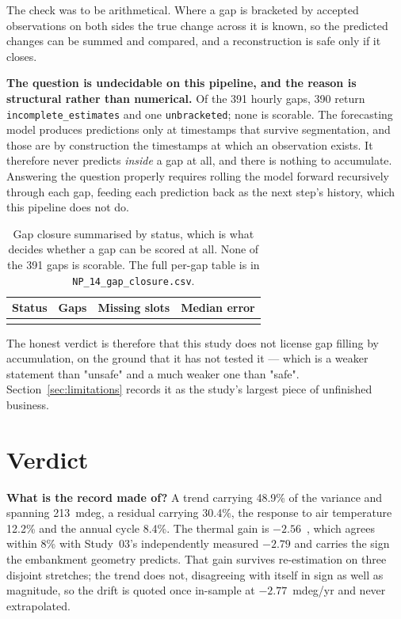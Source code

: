 \documentclass[11pt,a4paper]{article}
\begin{document}
The check was to be arithmetical. Where a gap is bracketed by accepted
observations on both sides the true change across it is known, so the predicted
changes can be summed and compared, and a reconstruction is safe only if it
closes.

\textbf{The question is undecidable on this pipeline, and the reason is
structural rather than numerical.} Of the 391 hourly gaps, 390 return
\texttt{incomplete\_estimates} and one \texttt{unbracketed}; none is scorable.
The forecasting model produces predictions only at timestamps that survive
segmentation, and those are by construction the timestamps at which an
observation exists. It therefore never predicts \emph{inside} a gap at all, and
there is nothing to accumulate. Answering the question properly requires rolling
the model forward recursively through each gap, feeding each prediction back as
the next step's history, which this pipeline does not do.

\begin{table}[H]
\centering
\caption{Gap closure summarised by status, which is what decides whether a gap
can be scored at all. None of the 391 gaps is scorable. The full per-gap table
is in \texttt{NP\_14\_gap\_closure.csv}.}
\label{tab:closure}
\begin{tabular}{lrrr}
\toprule
Status & Gaps & Missing slots & Median error \\
\midrule
\\
\bottomrule
\end{tabular}
\end{table}

The honest verdict is therefore that this study does not license gap filling by
accumulation, on the ground that it has not tested it --- which is a weaker
statement than "unsafe" and a much weaker one than "safe". Section~\ref{sec:limitations}
records it as the study's largest piece of unfinished business.

\section{Verdict}
\label{sec:verdict}

\textbf{What is the record made of?} A trend carrying 48.9\% of the variance and
spanning 213~mdeg, a residual carrying 30.4\%, the response to air temperature
12.2\% and the annual cycle 8.4\%. The thermal gain is $-2.56$~\mdegC, which
agrees within 8\% with Study~03's independently measured $-2.79$ and carries the
sign the embankment geometry predicts. That gain survives re-estimation on three
disjoint stretches; the trend does not, disagreeing with itself in sign as well
as magnitude, so the drift is quoted once in-sample at $-2.77$~mdeg/yr and never
extrapolated.
\end{document}
